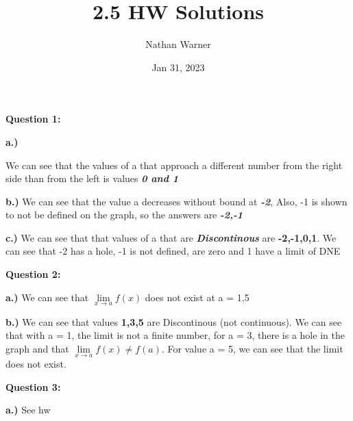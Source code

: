 \documentclass{report}
\title{\Huge{2.5 HW Solutions}}
\author{\huge{Nathan Warner}}
\date{\huge{Jan 31, 2023}}
\begin{document}
    \maketitle
    \begin{Large}
        \noindent \textbf{Question 1:}
    \end{Large} 

    \bigbreak \noindent 
    \textbf{a.)}

    \bigbreak \noindent 
    We can see that the values of a that approach a different number from the right side than
    from the left is values \textbf{\textit{0 and 1}}

    \bigbreak \noindent \bigbreak \noindent \bigbreak \noindent  
    \textbf{b.)} 
    \bigbreak \noindent 
    We can see that the value a decreases without bound at \textbf{\textit{-2}}, Also, -1 is shown to 
    not be defined on the graph, so the answers are \textbf{\textit{-2,-1}}

    \bigbreak \noindent \bigbreak \noindent \bigbreak \noindent 
    \textbf{c.)}
    \bigbreak \noindent 
    We can see that that values of a that are \textbf{\textit{Discontinous}} are \textbf{-2,-1,0,1}.
    We can see that -2 has a hole, -1 is not defined, are zero and 1 have a limit of DNE


    \bigbreak \noindent \bigbreak \noindent \bigbreak \noindent  
    \begin{Large}
        \textbf{Question 2:}
    \end{Large}

    \bigbreak \noindent 
    \textbf{a.)}
    \bigbreak \noindent 
    We can see that $\lim\limits_{x \to a}{f \left(x\right)}$ does not exist at a = 1,5

    \bigbreak \noindent 
    \textbf{b.)}
    \bigbreak \noindent 
    We can see that values \textbf{1,3,5} are Discontinous (not continuous). We can see that 
    with a = 1, the limit is not a finite number, for a = 3, there is a hole in the graph and 
    that $\lim\limits_{x \to a}{f \left(x\right)} \neq f \left(a\right)$. For value a = 5, we can 
    see that the limit does not exist.


    \bigbreak \noindent \bigbreak \noindent \bigbreak \noindent  
    \begin{Large}
        \textbf{Question 3:}
    \end{Large}

    \bigbreak \noindent 
    \textbf{a.)}
    \bigbreak \noindent 
    See hw
\end{document}
